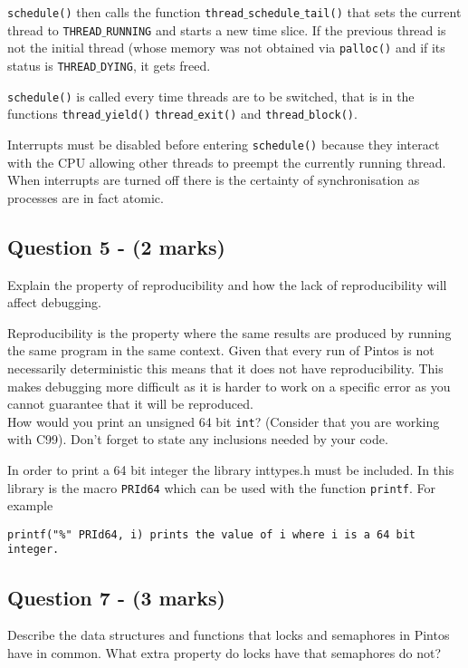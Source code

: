 \documentclass[a4paper,12pt]{article}
\begin{document}
\texttt{schedule()} then calls the function \texttt{thread$\_$schedule$\_$tail()} that sets the current thread to \texttt{THREAD$\_$RUNNING} and starts a new time slice. If the previous thread is not the initial thread (whose memory was not obtained via \texttt{palloc()} and if its status is \texttt{THREAD$\_$DYING}, it gets freed.

\texttt{schedule()} is called every time threads are to be switched, that is in the functions \texttt{thread$\_$yield()} \texttt{thread$\_$exit()} and \texttt{thread$\_$block()}.

Interrupts must be disabled before entering \texttt{schedule()} because they interact with the CPU allowing other threads to preempt the currently running thread. When interrupts are turned off there is the certainty of synchronisation as processes are in fact atomic.\\

\subsection*{Question 5 - (2 marks)}
Explain the property of reproducibility and how the lack of reproducibility will affect debugging.

Reproducibility is the property where the same results are produced by running the same program in the same context. Given that every run of Pintos is not necessarily deterministic this means that it does not have reproducibility. This makes debugging more difficult as it is harder to work on a specific error as you cannot guarantee that it will be reproduced.\\

How would you print an unsigned 64 bit \texttt{int}?
(Consider that you are working with C99).
Don't forget to state any inclusions needed by your code.

In order to print a 64 bit integer the library inttypes.h must be included. In this library is the macro \texttt{PRId64} which can be used with the function \texttt{printf}. For example

\begin{verbatim}
printf("%" PRId64, i) prints the value of i where i is a 64 bit integer.
\end{verbatim}

\subsection*{Question 7 - (3 marks)}
Describe the data structures and functions that locks and semaphores in Pintos have in common.
What extra property do locks have that semaphores do not?
\end{document}
